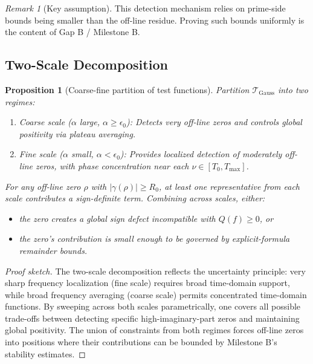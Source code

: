 \documentclass[11pt]{article}
\theoremstyle{plain}
\newtheorem{proposition}[theorem]{Proposition}
\theoremstyle{definition}
\theoremstyle{remark}
\newtheorem{remark}[theorem]{Remark}
\begin{document}
\begin{remark}[Key assumption]
This detection mechanism relies on prime-side bounds being smaller than the off-line residue.
Proving such bounds uniformly is the content of Gap B / Milestone B.
\end{remark}

\subsection{Two-Scale Decomposition}

\begin{proposition}[Coarse-fine partition of test functions]
Partition $\mathcal{T}_{\mathrm{Gauss}}$ into two regimes:
\begin{enumerate}
  \item \emph{Coarse scale} ($\alpha$ large, $\alpha\ge \epsilon_0$): Detects very off-line zeros
  and controls global positivity via plateau averaging.
  \item \emph{Fine scale} ($\alpha$ small, $\alpha < \epsilon_0$): Provides localized detection of
  moderately off-line zeros, with phase concentration near each $\nu\in[T_0,T_{\max}]$.
\end{enumerate}
For any off-line zero $\rho$ with $|\gamma(\rho)|\ge R_0$, at least one representative from
each scale contributes a sign-definite term.
Combining across scales, either:
\begin{itemize}
  \item the zero creates a global sign defect incompatible with $Q(f)\ge 0$, or
  \item the zero's contribution is small enough to be governed by explicit-formula remainder bounds.
\end{itemize}
\end{proposition}

\begin{proof}[Proof sketch]
The two-scale decomposition reflects the uncertainty principle: very sharp frequency localization
(fine scale) requires broad time-domain support, while broad frequency averaging (coarse scale)
permits concentrated time-domain functions.
By sweeping across both scales parametrically, one covers all possible trade-offs between
detecting specific high-imaginary-part zeros and maintaining global positivity.
The union of constraints from both regimes forces off-line zeros into positions where
their contributions can be bounded by Milestone B's stability estimates.
\end{proof}
\end{document}
